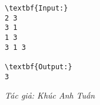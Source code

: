 \begin{verbatim}
\textbf{Input:}
2 3
3 1
1 3
3 1 3

\textbf{Output:}
3
\end{verbatim}

\emph{Tác giả: Khúc Anh Tuấn }